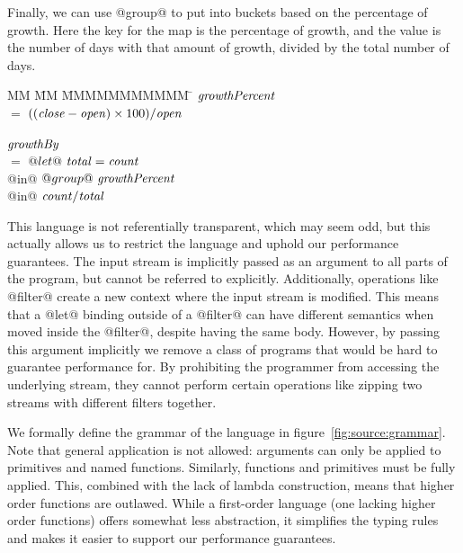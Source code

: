 Finally, we can use @group@ to put into buckets based on the percentage of growth.
Here the key for the map is the percentage of growth, and the value is the number of days with that amount of growth, divided by the total number of days.
\begin{tabbing}
MM \= MM \= MMMMMMMMMMM \= \kill
$\mathit{growthPercent}$                                        \\
 \> $=$  \> $((\mathit{close}-\mathit{open}) \times 100 ) / \mathit{open}$  \\
                                                            \\
$\mathit{growthBy}$                                             \\
 \> $=$  \> $@let@~\mathit{total} = \mathit{count}$                 \\
 \> @in@ \> $@group@~\mathit{growthPercent}$                    \\
 \> @in@ \> $\mathit{count} / \mathit{total}$                    \\
\end{tabbing}



This language is not referentially transparent, which may seem odd, but this actually allows us to restrict the language and uphold our performance guarantees.
The input stream is implicitly passed as an argument to all parts of the program, but cannot be referred to explicitly.
Additionally, operations like @filter@ create a new context where the input stream is modified.
This means that a @let@ binding outside of a @filter@ can have different semantics when moved inside the @filter@, despite having the same body.
However, by passing this argument implicitly we remove a class of programs that would be hard to guarantee performance for.
By prohibiting the programmer from accessing the underlying stream, they cannot perform certain operations like zipping two streams with different filters together.

We formally define the grammar of the language in figure~\ref{fig:source:grammar}.
Note that general application is not allowed: arguments can only be applied to primitives and named functions.
Similarly, functions and primitives must be fully applied.
This, combined with the lack of lambda construction, means that higher order functions are outlawed.
While a first-order language (one lacking higher order functions) offers somewhat less abstraction, it simplifies the typing rules and makes it easier to support our performance guarantees.

